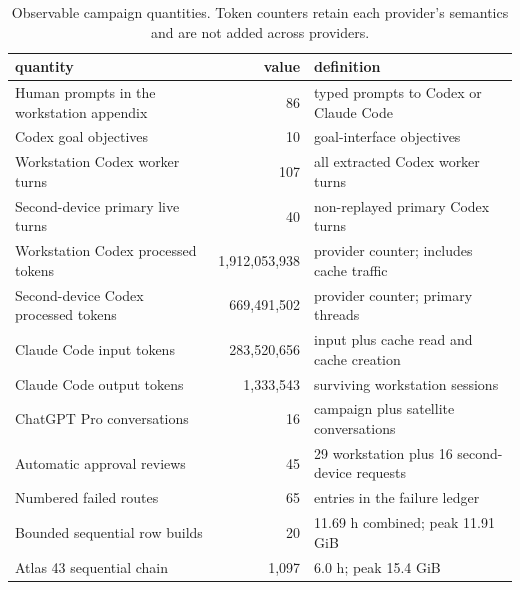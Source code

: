 \begin{table}[t]
\centering
\small
\caption{Observable campaign quantities.  Token counters retain each provider's semantics and are not added across providers.}
\label{tab:campaign-quantities}
\begin{tabular}{p{5.5cm} r p{6.0cm}}
\toprule
quantity & value & definition\\
\midrule
Human prompts in the workstation appendix & 86 & typed prompts to Codex or Claude Code\\
Codex goal objectives & 10 & goal-interface objectives\\
Workstation Codex worker turns & 107 & all extracted Codex worker turns\\
Second-device primary live turns & 40 & non-replayed primary Codex turns\\
Workstation Codex processed tokens & 1,912,053,938 & provider counter; includes cache traffic\\
Second-device Codex processed tokens & 669,491,502 & provider counter; primary threads\\
Claude Code input tokens & 283,520,656 & input plus cache read and cache creation\\
Claude Code output tokens & 1,333,543 & surviving workstation sessions\\
ChatGPT Pro conversations & 16 & campaign plus satellite conversations\\
Automatic approval reviews & 45 & 29 workstation plus 16 second-device requests\\
Numbered failed routes & 65 & entries in the failure ledger\\
Bounded sequential row builds & 20 & 11.69 h combined; peak 11.91 GiB\\
Atlas 43 sequential chain & 1,097 & 6.0 h; peak 15.4 GiB\\
\bottomrule
\end{tabular}
\end{table}
